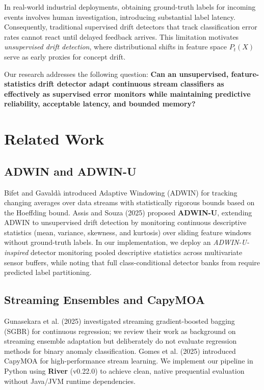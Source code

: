 \documentclass[conference]{IEEEtran}
\begin{document}
In real-world industrial deployments, obtaining ground-truth labels for incoming events involves human investigation, introducing substantial label latency. Consequently, traditional supervised drift detectors that track classification error rates cannot react until delayed feedback arrives. This limitation motivates \emph{unsupervised drift detection}, where distributional shifts in feature space $P_t(X)$ serve as early proxies for concept drift.

Our research addresses the following question: \textbf{Can an unsupervised, feature-statistics drift detector adapt continuous stream classifiers as effectively as supervised error monitors while maintaining predictive reliability, acceptable latency, and bounded memory?}

\section{Related Work}
\subsection{ADWIN and ADWIN-U}
Bifet and Gavald\`a introduced Adaptive Windowing (ADWIN) for tracking changing averages over data streams with statistically rigorous bounds based on the Hoeffding bound. Assis and Souza (2025) \cite{adwinu} proposed \textbf{ADWIN-U}, extending ADWIN to unsupervised drift detection by monitoring continuous descriptive statistics (mean, variance, skewness, and kurtosis) over sliding feature windows without ground-truth labels. In our implementation, we deploy an \emph{ADWIN-U-inspired} detector monitoring pooled descriptive statistics across multivariate sensor buffers, while noting that full class-conditional detector banks from \cite{adwinu} require predicted label partitioning.

\subsection{Streaming Ensembles and CapyMOA}
Gunasekara et al. (2025) \cite{sgbr} investigated streaming gradient-boosted bagging (SGBR) for continuous regression; we review their work as background on streaming ensemble adaptation but deliberately do not evaluate regression methods for binary anomaly classification. Gomes et al. (2025) \cite{capymoa} introduced CapyMOA for high-performance stream learning. We implement our pipeline in Python using \textbf{River} (v0.22.0) to achieve clean, native prequential evaluation without Java/JVM runtime dependencies.
\end{document}
